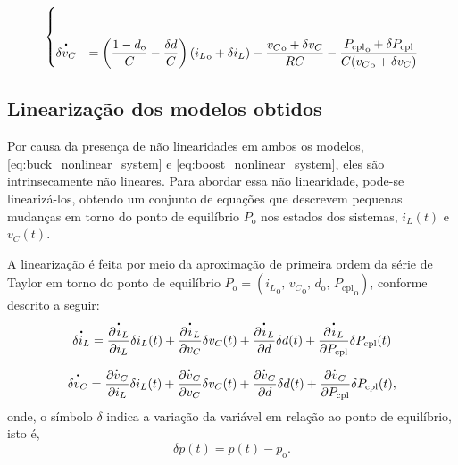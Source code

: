 \begin{equation}
\begin{cases}
    \\[12pt]
    
    \dt{\delta {v}_C} &= \displaystyle \left( \frac{1 - d_{\mathrm{o}}}{C} - \frac{\delta d}{C} \right)\left({i_L}_{\mathrm{o}} + \delta i_L\right) - \frac{{v_C}_{\mathrm{o}} + \delta v_C}{RC} - \frac{{{P_{\mathrm{cpl}}}_{\mathrm{o}} + \delta P_{\mathrm{cpl}}}}{C({v_C}_{\mathrm{o}} + \delta {v_C})}
  \end{cases}
\end{equation} 
\vspace{1pt}

\subsection{Linearização dos modelos obtidos}

Por causa da presença de não linearidades em ambos os modelos, \eqref{eq:buck_nonlinear_system} e \eqref{eq:boost_nonlinear_system}, eles são intrinsecamente não lineares. Para abordar essa não linearidade, pode-se linearizá-los, obtendo um conjunto de equações que descrevem pequenas mudanças em torno do ponto de equilíbrio $P_{\mathrm{o}}$ nos estados dos sistemas, $i_L(t)$ e $v_C(t)$.

A linearização é feita por meio da aproximação de primeira ordem da série de Taylor em torno do ponto de equilíbrio $P_{\mathrm{o}} = ({i_L}_{\mathrm{o}}, \, {v_C}_{\mathrm{o}}, \, {d}_{\mathrm{o}}, \, {P_{\mathrm{cpl}}}_{\mathrm{o}})$, conforme descrito a seguir: \begin{gather}  \dt{\delta i_L} = \frac{\partial \dt{i}_L}{\partial i_L}\delta i_L(t) + \frac{\partial \dt{i}_L}{\partial v_C}\delta v_C(t) + \frac{\partial {\dt{i}_L}}{\partial d}\delta d(t) + \frac{\partial {\dt{i}_L}}{\partial P_{\mathrm{cpl}}}\delta P_{\mathrm{cpl}}(t) \\ \nonumber \\ \dt{\delta v_C} = \frac{\partial \dt{v}_C}{\partial i_L}\delta i_L(t) + \frac{\partial \dt{v}_C}{\partial v_C}\delta v_C(t) + \frac{\partial \dt{v}_C}{\partial d}\delta d(t) + \frac{\partial \dt{v}_C}{\partial P_{\mathrm{cpl}}}\delta P_{\mathrm{cpl}}(t), \end{gather} onde, o símbolo $\delta$ indica a variação da variável em relação ao ponto de equilíbrio, isto é, \begin{equation} \delta p(t) = p(t) - p_{\mathrm{o}}. \label{eq:delta}\end{equation}

